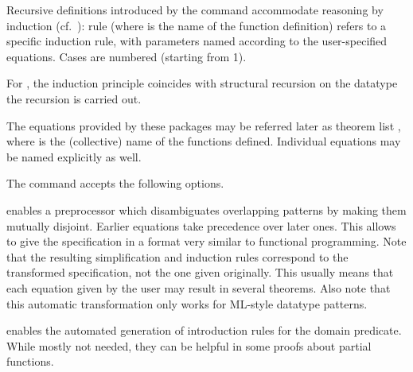 \begin{isabellebody}
\begin{isamarkuptext}
  Recursive definitions introduced by the \hyperlink{command.HOL.function}{\mbox{}}
  command accommodate
  reasoning by induction (cf.\ ): rule  (where  is the name of the function definition)
  refers to a specific induction rule, with parameters named according
  to the user-specified equations. Cases are numbered (starting from 1).

  For \hyperlink{command.HOL.primrec}{\mbox{}}, the induction principle coincides
  with structural recursion on the datatype the recursion is carried
  out.

  The equations provided by these packages may be referred later as
  theorem list , where  is the (collective)
  name of the functions defined.  Individual equations may be named
  explicitly as well.

  The \hyperlink{command.HOL.function}{\mbox{}} command accepts the following
  options.

  \begin{description}

  \item {} enables a preprocessor which disambiguates
  overlapping patterns by making them mutually disjoint.  Earlier
  equations take precedence over later ones.  This allows to give the
  specification in a format very similar to functional programming.
  Note that the resulting simplification and induction rules
  correspond to the transformed specification, not the one given
  originally. This usually means that each equation given by the user
  may result in several theorems.  Also note that this automatic
  transformation only works for ML-style datatype patterns.

  \item {} enables the automated generation of
  introduction rules for the domain predicate. While mostly not
  needed, they can be helpful in some proofs about partial functions.


\end{description}
\end{isamarkuptext}
\end{isabellebody}
